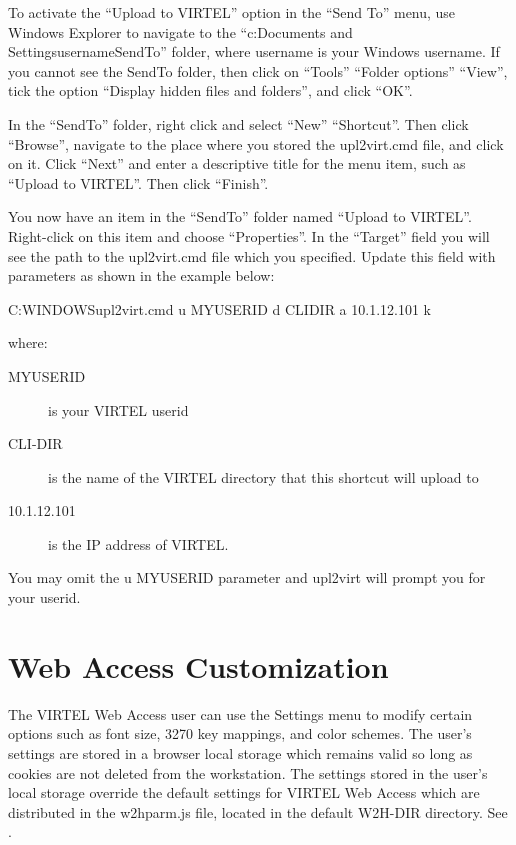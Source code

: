 \documentclass[letterpaper,10pt,english]{sphinxmanual}
\begin{document}
To activate the “Upload to VIRTEL” option in the “Send To” menu, use Windows Explorer to navigate to the “c:Documents and SettingsusernameSendTo” folder, where username is your Windows username. If you cannot see the SendTo folder, then click on “Tools” \textendash{} “Folder options” \textendash{} “View”, tick the option “Display hidden files and folders”, and click “OK”.

In the “SendTo” folder, right click and select “New” \textendash{} “Shortcut”. Then click “Browse”, navigate to the place where you stored the upl2virt.cmd file, and click on it. Click “Next” and enter a descriptive title for the menu item, such as “Upload to VIRTEL”. Then click “Finish”.

You now have an item in the “SendTo” folder named “Upload to VIRTEL”. Right-click on this item and choose “Properties”. In the “Target” field you will see the path to the upl2virt.cmd file which you specified. Update this field with parameters as shown in the example below:

\begin{sphinxVerbatim}[commandchars=\\\{\}]
C:\PYGZbs{}WINDOWS\PYGZbs{}upl2virt.cmd \PYGZhy{}u MYUSERID \PYGZhy{}d CLI\PYGZhy{}DIR \PYGZhy{}a 10.1.12.101 \textendash{}k
\end{sphinxVerbatim}

where:
\begin{description}
\item[{MYUSERID}] \leavevmode
is your VIRTEL userid

\item[{CLI-DIR}] \leavevmode
is the name of the VIRTEL directory that this shortcut will upload to

\item[{10.1.12.101}] \leavevmode
is the IP address of VIRTEL.

\end{description}

You may omit the \textendash{}u MYUSERID parameter and upl2virt will prompt you for your userid.


\section{Web Access Customization}
\label{\detokenize{User_Guide:web-access-customization}}
The VIRTEL Web Access user can use the Settings menu to modify certain options such as font size, 3270 key mappings, and color schemes. The user’s settings are stored in a browser local storage which remains valid so long as cookies are not deleted from the workstation. The settings stored in the user’s local storage override the default settings for VIRTEL Web Access which are distributed in the w2hparm.js file, located in the default W2H-DIR directory. See {\hyperref[\detokenize{User_Guide:v457ug-global-modifications}]{}}.
\end{document}
